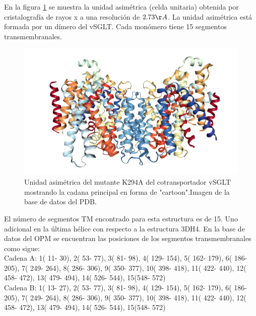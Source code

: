En la figura \ref{fig:2xq2} se muestra la unidad asim\'{e}trica (celda unitaria) obtenida por cristalograf\'{i}a de rayos x a una resoluci\'{o}n de $2.73\AA$. La unidad asim\'{e}trica est\'{a} formada por un d\'{i}mero del vSGLT. Cada mon\'{o}mero tiene 15 segmentos transmembranales.\\
\begin{figure}[H]
\centering
\includegraphics[scale=0.2]{Kap3/2xq2.png}
\caption{Unidad asim\'{e}trica del mutante K294A del cotransportador vSGLT mostrando la cadana principal en forma de "cartoon".Imagen de la base de datos del PDB.}\label{fig:2xq2}
\end{figure}
El n\'{u}mero de segmentos TM encontrado para esta estructura es de 15. Uno adicional en la \'{u}ltima h\'{e}lice con respecto a la estructura 3DH4. En la base de datos del OPM se encuentran las posiciones de los segmentos transmembranales como sigue:\\

Cadena A: 1( 11- 30), 2( 53- 77), 3( 81- 98), 4( 129- 154), 5( 162- 179), 6( 186- 205), 7( 249- 264), 8( 286- 306), 9( 350- 377), 10( 398- 418), 11( 422- 440), 12( 458- 472), 13( 479- 494), 14( 526- 544), 15(548- 572)\\
Cadena B: 1( 13- 27), 2( 53- 77), 3( 81- 98), 4( 129- 154), 5( 162- 179), 6( 186- 205), 7( 249- 264), 8( 286- 306), 9( 350- 377), 10( 398- 418), 11( 422- 440), 12( 458- 472), 13( 479- 494), 14( 526- 544), 15(548- 572)\\
